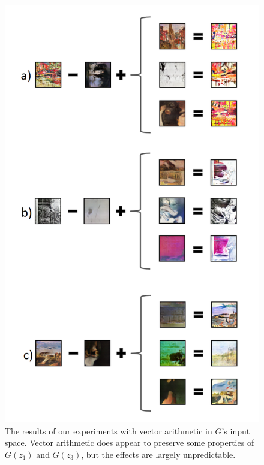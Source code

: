 \documentclass[10pt,twocolumn,letterpaper]{article}
\begin{document}
\begin{figure}[t]
	\begin{center}
		\includegraphics[width=0.825\linewidth]{arith_figure.png}
	\end{center}
	\caption{The results of our experiments with vector arithmetic in $ G $'s input space. Vector arithmetic does appear to preserve some properties of $ G(z_1) $ and $ G(z_3) $, but the effects are largely unpredictable.}
	\label{fig:long}
	\label{fig:onecol}
\end{figure}
\end{document}
